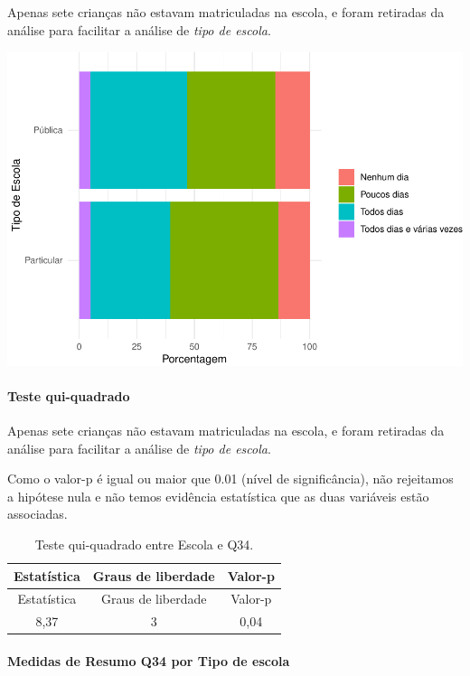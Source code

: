 \documentclass[]{article}
\let\oldparagraph\paragraph
\renewcommand{\paragraph}[1]{\oldparagraph{#1}\mbox{}}
\begin{document}
Apenas sete crianças não estavam matriculadas na escola, e foram retiradas da análise para facilitar a análise de \emph{tipo de escola}.

\begin{center}\includegraphics[width=0.75\linewidth]{relatorio_covid19_files/figure-latex/unnamed-chunk-1234-1} \end{center}

\hypertarget{teste-qui-quadrado-106}{%
\paragraph{Teste qui-quadrado}\label{teste-qui-quadrado-106}}

Apenas sete crianças não estavam matriculadas na escola, e foram retiradas da análise para facilitar a análise de \emph{tipo de escola}.

Como o valor-p é igual ou maior que 0.01 (nível de significância), não rejeitamos a hipótese nula e não temos evidência estatística que as duas variáveis estão associadas.

\begin{longtable}[]{@{}ccc@{}}
\caption{\label{tab:unnamed-chunk-1236}Teste qui-quadrado entre Escola e Q34.}\tabularnewline
\toprule
Estatística & Graus de liberdade & Valor-p\tabularnewline
\midrule
\endfirsthead
\toprule
Estatística & Graus de liberdade & Valor-p\tabularnewline
\midrule
\endhead
8,37 & 3 & 0,04\tabularnewline
\bottomrule
\end{longtable}

\cleardoublepage

\hypertarget{medidas-de-resumo-q34-por-tipo-de-escola}{%
\paragraph{Medidas de Resumo Q34 por Tipo de escola}\label{medidas-de-resumo-q34-por-tipo-de-escola}}
\end{document}

